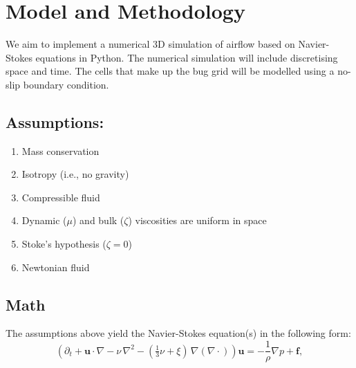 \documentclass{article}
\numberwithin{figure}{section}  %
\numberwithin{equation}{section}  %
\begin{document}
\newpage


\section{Model and Methodology}
We aim to implement a numerical 3D simulation of airflow based on Navier-Stokes equations in Python. The numerical simulation will include discretising space and time. The cells that make up the bug grid will be modelled using a no-slip boundary condition.

\subsection{Assumptions:}
\begin{multicols}{2}
\begin{enumerate}
    \item Mass conservation
    \item Isotropy (i.e., no gravity)
    \item Compressible fluid
    \item Dynamic ($\mu$) and bulk ($\zeta$) viscosities are uniform in space
    \item Stoke's hypothesis ($\zeta=0$)
    \item Newtonian fluid
\end{enumerate}
\end{multicols}

\subsection{Math}
The assumptions above yield the Navier-Stokes equation(s) \cite{batchelor2000introduction} in the following form:
\begin{equation}
{\left(\partial_t +\mathbf {u} \cdot \nabla -\nu \,\nabla ^{2}-({\tfrac {1}{3}}\nu +\xi )\,\nabla (\nabla \cdot )\right)\mathbf {u} =-{\frac {1}{\rho }}\nabla p+\mathbf {f} ,}
\end{equation}
\end{document}
